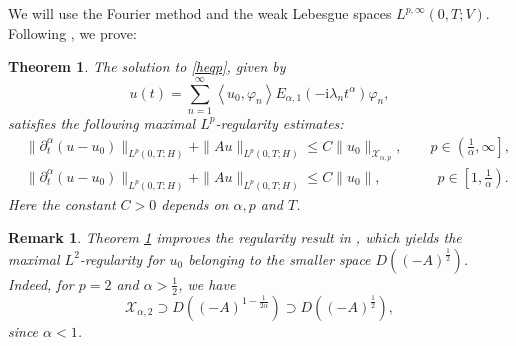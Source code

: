 \documentclass[reqno]{amsart}
\newtheorem{theorem}{Theorem}[section]
\newtheorem{rmk}{Remark}
\numberwithin{equation}{section}
\begin{document}
We will use the Fourier method and the weak Lebesgue spaces $L^{p,\infty}(0,T;V)$. Following \cite{Ji21}, we prove:
\begin{theorem}\label{thmMRh}
The solution to \eqref{heqp}, given by
\begin{equation}\label{Formula SEH}
u(t)=\sum_{n=1}^{\infty}\left\langle u_0, \varphi_n\right\rangle E_{\alpha, 1}\left(-\mathrm{i} \lambda_n t^\alpha\right) \varphi_n,
\end{equation}
satisfies the following maximal $L^p$-regularity estimates:
\begin{align}
&\|\partial_t^\alpha (u-u_0)\|_{L^p(0,T;H)}
	+ \|Au\|_{L^p(0,T;H)}
	\le C \|u_0\|_{\mathcal{X}_{\alpha,p}},
    \qquad p\in\left(\tfrac1\alpha,\infty\right], \label{HML1}\\
&\|\partial_t^\alpha (u-u_0)\|_{L^p(0,T;H)}
	+ \|Au\|_{L^p(0,T;H)}
	\le C \|u_0\|,
	 \qquad\qquad p\in\left[1,\tfrac1\alpha\right). \label{HML3}
\end{align}
Here the constant $C>0$ depends on $\alpha, p$ and $T$.
\end{theorem}
\begin{rmk}
Theorem \ref{thmMRh} improves the regularity result in \cite[Theorem 3.3]{CEMY25}, which yields the maximal $L^2$-regularity for $u_0$ belonging to the smaller space $D\left((-A)^\frac{1}{2}\right)$. Indeed, for $p=2$ and $\alpha>\frac{1}{2}$, we have
$$\mathcal{X}_{\alpha,2}\supset D\left((-A)^{1-\frac{1}{2\alpha}}\right) \supset D\left((-A)^\frac{1}{2}\right),$$
since $\alpha<1$.
\end{rmk}
\end{document}
